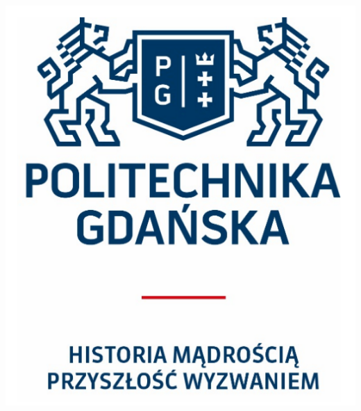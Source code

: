 \begin{frame}[plain]
\addtocounter{framenumber}{-1}
\vspace{1cm}
\begin{center}
\includegraphics[keepaspectratio=true,scale=0.25]{logokoniec.png}
\end{center}
\end{frame}



